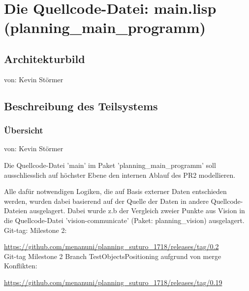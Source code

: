\documentclass{suturo}
\makeatletter
\newcommand{\chapterauthor}[1]{%
  {\parindent0pt\vspace*{-27pt}%
  \linespread{0}\small\begin{flushright}von: #1\end{flushright}%
  \par\nobreak\vspace*{0pt}}
  \@afterheading%
}
\makeatother
\begin{document}
\section{Die Quellcode-Datei: main.lisp (planning\_main\_programm)}
\subsection{Architekturbild}
\chapterauthor{Kevin Störmer}


\begin{figure}[!htb]
\end{figure}



\subsection{Beschreibung des Teilsystems}
\subsubsection{\"Ubersicht}
\chapterauthor{Kevin Störmer}
Die Quellcode-Datei 'main' im Paket 'planning\_main\_programm' soll ausschliesslich auf höchster Ebene den internen Ablauf des PR2 modellieren. 

Alle dafür notwendigen Logiken, die auf Basis externer Daten entschieden werden, wurden dabei basierend auf der Quelle der Daten in andere Quellcode-Dateien ausgelagert. Dabei wurde z.b der Vergleich zweier Punkte aus Vision in die Quellcode-Datei 'vision-communicate' (Paket: planning\_vision) ausgelagert. \\


Git-tag: Milestone 2:

\url{https://github.com/menanuni/planning_suturo_1718/releases/tag/0.2} \\

Git-tag Milestone 2 Branch TestObjectsPositioning aufgrund von merge Konflikten:

\url{https://github.com/menanuni/planning_suturo_1718/releases/tag/0.19}\\
\end{document}
